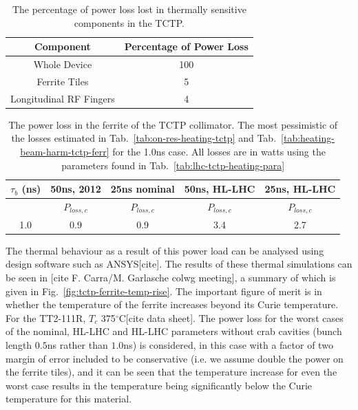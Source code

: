 \begin{table}
\label{tab:tctp-heating-loc}
\caption{The percentage of power loss lost in thermally sensitive components in the TCTP.}
\begin{center}
\begin{tabular}{c | c}
Component & Percentage of Power Loss \\ \hline
Whole Device & 100 \\ \hline
Ferrite Tiles & 5 \\ \hline
Longitudinal RF Fingers & 4 \\
\end{tabular}
\end{center}
\end{table}

\begin{table}
\label{tab:heating-ferr-power-load}
\caption{The power loss in the ferrite of the TCTP collimator. The most pessimistic of the losses estimated in Tab.~\ref{tab:on-res-heating-tctp} and Tab.~\ref{tab:heating-beam-harm-tctp-ferr} for the 1.0ns case. All losses are in watts using the parameters found in Tab.~\ref{tab:lhc-tctp-heating-para}}
\begin{center}
\begin{tabular}{c | c | c | c | c }
$\tau_{b}$ (ns) & 50ns, 2012 & 25ns nominal & 50ns, HL-LHC & 25ns, HL-LHC \\ \hline
 &  $P_{loss, c}$  & $P_{loss, c}$ &  $P_{loss, c}$  & $P_{loss, c}$ \\ \hline
1.0 & 0.9 & 0.9 & 3.4 & 2.7 
\end{tabular}
\end{center}
\end{table}


The thermal behaviour as a result of this power load can be analysed using design software such as ANSYS[cite]. The results of these thermal simulations can be seen in [cite F. Carra/M. Garlasche colwg meeting], a summary of which is given in Fig.~\ref{fig:tctp-ferrite-temp-rise}. The important figure of merit is in whether the temperature of the ferrite increases beyond its Curie temperature. For the TT2-111R, $T_{c}$ 375$^{\circ}$C[cite data sheet]. The power loss for the worst cases of the nominal, HL-LHC and HL-LHC parameters without crab cavities (bunch length $0.5$ns rather than $1.0$ns) is considered, in this case with a factor of two margin of error included to be conservative (i.e. we assume double the power on the ferrite tiles), and it can be seen that the temperature increase for even the worst case results in the temperature being significantly below the Curie temperature for this material.

